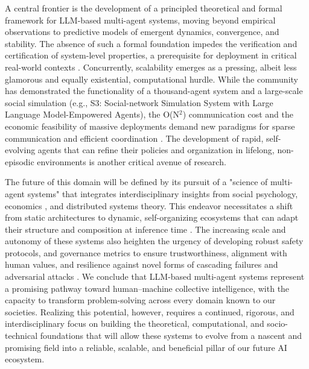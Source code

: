 \documentclass[11pt,a4paper]{article}
\begin{document}
A central frontier is the development of a principled theoretical and formal framework for LLM-based multi-agent systems, moving beyond empirical observations to predictive models of emergent dynamics, convergence, and stability. The absence of such a formal foundation impedes the verification and certification of system-level properties, a prerequisite for deployment in critical real-world contexts \cite{arxiv:2402.00798v2,arxiv:2402.14672v1}. Concurrently, scalability emerges as a pressing, albeit less glamorous and equally existential, computational hurdle. While the community has demonstrated the functionality of a thousand-agent system \cite{arxiv:2406.07155v1} and a large-scale social simulation (e.g., S3: Social-network Simulation System with Large Language Model-Empowered Agents), the O(N$^{2}$) communication cost \cite{arxiv:2006.00176v2,arxiv:2010.01523v1} and the economic feasibility of massive deployments demand new paradigms for sparse communication and efficient coordination \cite{arxiv:2308.05960v1,arxiv:2401.07324v3}. The development of rapid, self-evolving agents that can refine their policies and organization in lifelong, non-episodic environments \cite{arxiv:2406.04151v1,arxiv:2404.02183v1} is another critical avenue of research.

The future of this domain will be defined by its pursuit of a "science of multi-agent systems" that integrates interdisciplinary insights from social psychology, economics \cite{arxiv:2310.06500v1}, and distributed systems theory. This endeavor necessitates a shift from static architectures to dynamic, self-organizing ecosystems that can adapt their structure and composition at inference time \cite{arxiv:2403.08282v2,arxiv:2310.02170v1}. The increasing scale and autonomy of these systems also heighten the urgency of developing robust safety protocols, and governance metrics to ensure trustworthiness, alignment with human values, and resilience against novel forms of cascading failures and adversarial attacks \cite{arxiv:2406.04151v1,arxiv:2407.07061v2}. We conclude that LLM-based multi-agent systems represent a promising pathway toward human--machine collective intelligence, with the capacity to transform problem-solving across every domain known to our societies. Realizing this potential, however, requires a continued, rigorous, and interdisciplinary focus on building the theoretical, computational, and socio-technical foundations that will allow these systems to evolve from a nascent and promising field into a reliable, scalable, and beneficial pillar of our future AI ecosystem.
\end{document}
